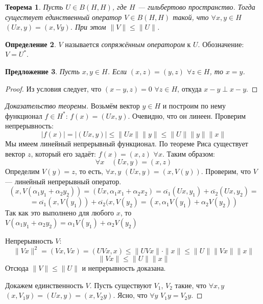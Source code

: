 \documentclass[11pt,openany,a4paper]{scrartcl}
\theoremstyle{plain}
\newtheorem{theorem}{Теорема}[subsection]
\newtheorem{proposition}[theorem]{Предложение}
\theoremstyle{definition}
\newtheorem{definition}[theorem]{Определение}
\newcommand\ol{\overline}
\begin{document}
\begin{theorem}
    Пусть $U \in B(H, H)$, где $H$ — гильбертово пространство. Тогда существует
    единственный оператор $V \in B(H, H)$ такой, что $\forall x,y \in H$
    $(Ux, y) = (x, Vy)$. При этом $\|V\| \leqslant \|U\|$.
\end{theorem}
\begin{definition}
    $V$ называется \emph{сопряжённым оператором} к $U$. Обозначение: $V = U^\ast$.
\end{definition}
\begin{proposition}
    Пусть $x, y \in H$. Если $(x, z) = (y, z)$ $\forall z \in H$, то $x = y$.
\end{proposition}
\begin{proof}
    Из условия следует, что $(x - y, z) = 0$ $\forall z \in H$, откуда
    $x - y \perp x - y$.
\end{proof}
\begin{proof}[Доказательство теоремы]
    Возьмём вектор $y \in H$ и построим по нему функционал $f \in H^\ast$:
    $f(x) = (Ux, y)$. Очевидно, что он линеен. Проверим непрерывность:
    $$
    |f(x)| = |(Ux, y)| \leqslant \|Ux\|\|y\| \leqslant \|U\|\|y\|\|x\|
    $$
    Мы имеем линейный непрерывный функционал. По теореме Риса существует вектор
    $z$, который его задаёт: $f(x) = (x, z)$ $\forall x$. Таким образом:
    $$
    \forall x\quad (Ux, y) = (x, z)
    $$
    Определим $V(y) = z$, то есть, $\forall x,y$ $(Ux, y) = (x, V(y))$.
    Проверим, что $V$ — линейный непрерывный оператор.
    $$
    (x, V(\alpha_1y_1 + \alpha_2y_2)) = (Ux, \alpha_1x_1 + \alpha_2x_2) =
    \ol{\alpha_1}(Ux, y_1) + \ol{\alpha_2}(Ux, y_2) =
    $$
    $$
    =\ol{\alpha_1}(x, V(y_1)) + \ol{\alpha_2}(x, V(y_2) =
    (x, \alpha_1V(y_1) + \alpha_2V(y_2))
    $$
    Так как это выполнено для любого $x$, то $V(\alpha_1y_1 + \alpha_2y_2) =
    \alpha_1V(y_1) + \alpha_2V(y_2)$
    
    Непрерывность $V$:
    $$
    \|Vx\|^2 = (Vx, Vx) = (UVx, x) \leqslant \|UVx\|\cdot\|x\| \leqslant
    \|U\|\|Vx\|\|x\|
    $$
    $$
    \|Vx\| \leqslant \|U\|\|x\|
    $$
    Отсюда $\|V\| \leqslant \|U\|$ и непрерывность доказана.
    
    Докажем единственность $V$. Пусть существуют $V_1$, $V_2$ такие, что
    $\forall x,y$ $(x, V_1y) = (Ux, y) = (x, V_2y)$. Ясно, что $\forall y$
    $V_1y = V_2y$.
\end{proof}
\end{document}
